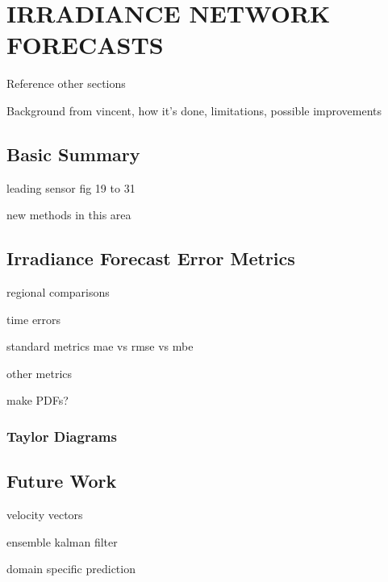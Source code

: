 \chapter{IRRADIANCE NETWORK FORECASTS}
\label{chap:network}

Reference other sections


Background from vincent, how it's done, limitations, possible
improvements

\section{Basic Summary}
leading sensor fig 19 to 31

new methods in this area

\section{Irradiance Forecast Error Metrics}
regional comparisons

time errors

standard metrics
mae vs rmse vs mbe

other metrics

make PDFs?


\subsection{Taylor Diagrams}


\section{Future Work}
velocity vectors

ensemble kalman filter

domain specific prediction

